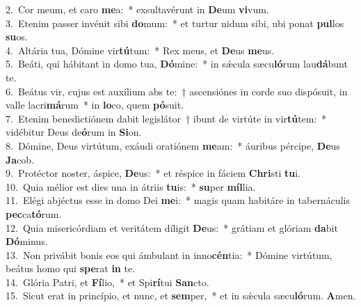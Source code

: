 {2.~}Cor meum, et caro \textbf{me}a:~* exsultavérunt in \textbf{De}um \textbf{vi}vum.\\
{3.~}Etenim passer invénit sibi \textbf{do}mum:~* et turtur nidum sibi, ubi ponat \textbf{pul}los \textbf{su}os.\\
{4.~}Altária tua, Dómine vir\textbf{tú}tum:~* Rex meus, et \textbf{De}us \textbf{me}us.\\
{5.~}Beáti, qui hábitant in domo tua, \textbf{Dó}mine:~* in sǽcula sæcu\textbf{ló}rum lau\textbf{dá}bunt te.\\
{6.~}Beátus vir, cujus est auxílium abs te:~† ascensiónes in corde suo dispósuit, in valle lacri\textbf{má}rum~* in \textbf{lo}co, quem \textbf{pó}suit.\\
{7.~}Etenim benedictiónem dabit legislátor~† ibunt de virtúte in vir\textbf{tú}tem:~* vidébitur Deus de\textbf{ó}rum in \textbf{Si}on.\\
{8.~}Dómine, Deus virtútum, exáudi oratiónem \textbf{me}am:~* áuribus pércipe, \textbf{De}us \textbf{Ja}cob.\\
{9.~}Protéctor noster, áspice, \textbf{De}us:~* et réspice in fáciem \textbf{Chri}sti \textbf{tu}i.\\
{10.~}Quia mélior est dies una in átriis \textbf{tu}is:~* \textbf{su}per \textbf{míl}lia.\\
{11.~}Elégi abjéctus esse in domo Dei \textbf{me}i:~* magis quam habitáre in tabernáculis \textbf{pec}ca\textbf{tó}rum.\\
{12.~}Quia misericórdiam et veritátem díligit \textbf{De}us:~* grátiam et glóriam \textbf{da}bit \textbf{Dó}minus.\\
{13.~}Non privábit bonis eos qui ámbulant in inno\textbf{cén}tia:~* Dómine virtútum, beátus homo qui \textbf{spe}rat \textbf{in} te.\\
{14.~}Glória Patri, et \textbf{Fí}lio,~* et Spi\textbf{rí}tui \textbf{San}cto.\\
{15.~}Sicut erat in princípio, et nunc, et \textbf{sem}per,~* et in sǽcula sæcu\textbf{ló}rum. \textbf{A}men.\\
